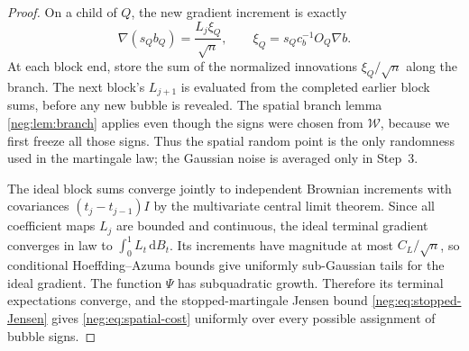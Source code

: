 \documentclass[11pt]{article}
\theoremstyle{definition}
\theoremstyle{remark}
\numberwithin{equation}{section}
\begin{document}
\begin{proof}
On a child of $Q$, the new gradient increment is exactly
\begin{equation}\label{neg:eq:grad-increment}
 \nabla(s_Qb_Q)=\frac{L_j\xi_Q}{\sqrt n},
 \qquad \xi_Q=s_Qc_b^{-1}O_Q\nabla b.
\end{equation}
At each block end, store the sum of the normalized innovations
$\xi_Q/\sqrt n$ along the branch. The next block's $L_{j+1}$ is
evaluated from the completed earlier block sums, before any new
bubble is revealed. The spatial branch lemma \cref{neg:lem:branch}
applies even though the signs were chosen from $\mathcal W$, because we
first freeze all those signs. Thus the spatial random point is the only
randomness used in the martingale law; the Gaussian noise is averaged
only in Step~3.

The ideal block sums converge jointly to independent Brownian
increments with covariances $(t_j-t_{j-1})I$ by the multivariate
central limit theorem. Since all coefficient maps $L_j$ are bounded
and continuous, the ideal terminal gradient converges in law to
$\int_0^1L_t\,\mathrm dB_t$. Its increments have magnitude at most
$C_L/\sqrt n$, so conditional Hoeffding--Azuma bounds give
uniformly sub-Gaussian tails for the ideal gradient. The function
$\Psi$ has subquadratic growth. Therefore its terminal expectations
converge, and the stopped-martingale Jensen bound
\eqref{neg:eq:stopped-Jensen} gives
\eqref{neg:eq:spatial-cost} uniformly over every possible
assignment of bubble signs.


\end{proof}
\end{document}
